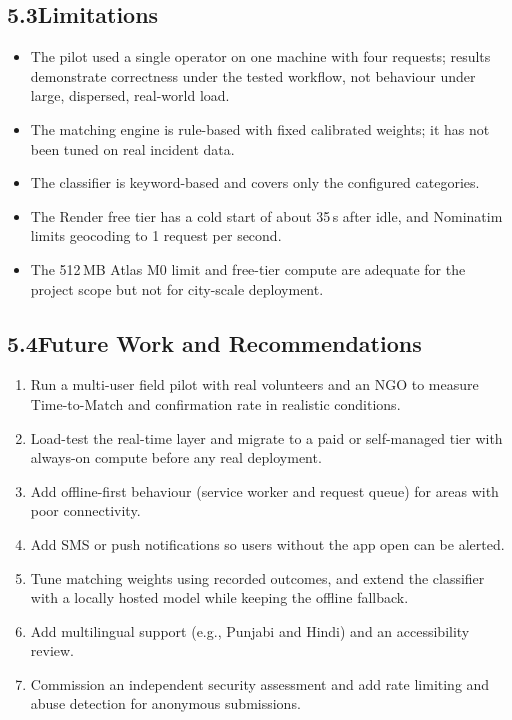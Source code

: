 \documentclass[11pt,a4paper]{article}
\begin{document}
\subsection{5.3\quad Limitations}\label{s53}

\begin{itemize}
\item The pilot used a single operator on one machine with four requests; results demonstrate correctness under the tested workflow, not behaviour under large, dispersed, real-world load.
\item The matching engine is rule-based with fixed calibrated weights; it has not been tuned on real incident data.
\item The classifier is keyword-based and covers only the configured categories.
\item The Render free tier has a cold start of about 35\,s after idle, and Nominatim limits geocoding to 1 request per second.
\item The 512\,MB Atlas M0 limit and free-tier compute are adequate for the project scope but not for city-scale deployment.
\end{itemize}

\subsection{5.4\quad Future Work and Recommendations}\label{s54}

\begin{enumerate}
\item Run a multi-user field pilot with real volunteers and an NGO to measure Time-to-Match and confirmation rate in realistic conditions.
\item Load-test the real-time layer and migrate to a paid or self-managed tier with always-on compute before any real deployment.
\item Add offline-first behaviour (service worker and request queue) for areas with poor connectivity.
\item Add SMS or push notifications so users without the app open can be alerted.
\item Tune matching weights using recorded outcomes, and extend the classifier with a locally hosted model while keeping the offline fallback.
\item Add multilingual support (e.g., Punjabi and Hindi) and an accessibility review.
\item Commission an independent security assessment and add rate limiting and abuse detection for anonymous submissions.
\end{enumerate}
\end{document}
